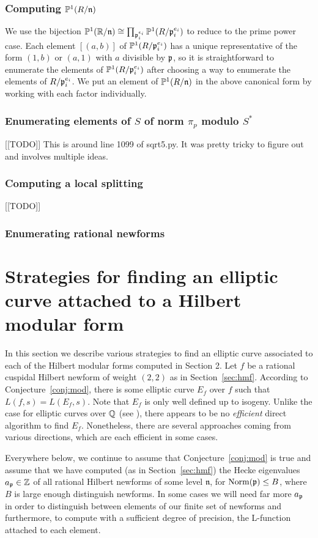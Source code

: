 \documentclass{amsart}
\newcommand{\n}{\mathfrak{n}}
\begin{document}
\subsubsection{Computing $\P^1(R/\n)$}
We use the bijection $\P^1(\R/\n) \isom \prod_{\p_i^{e_i}}
\P^1(R/\p_i^{e_i})$ to reduce to the prime power case.  Each element
$[(a,b)]$ of $\mathbb{P}^1(R/\mathfrak{p}_i^{e_i})$ has a unique representative of the
form $(1,b)$ or $(a,1)$ with $a$ divisible by $\mathfrak{p}$, so it is straightforward
to enumerate the elements of $\mathbb{P}^1(R/\mathfrak{p}_i^{e_i})$ after choosing a way
to enumerate the elements of $R/\mathfrak{p}_i^{e_i}$. We put an element
of $\P^1(R/\n)$ in the above canonical form by working with each factor
individually.

\subsubsection{Enumerating elements of $S$ of norm $\pi_p$ modulo $S^*$}
[[TODO]]
This is around line 1099 of sqrt5.py.  It was pretty tricky to figure out
and involves multiple ideas.

\subsubsection{Computing a local splitting}
[[TODO]]

\subsubsection{Enumerating rational newforms}


\section{Strategies for finding an elliptic curve attached to a Hilbert modular form}\label{sec:finding}
In this section we describe various strategies to find an elliptic curve
 associated to each of the Hilbert modular forms computed in Section 2.
Let $f$ be a rational cuspidal Hilbert newform of weight $(2,2)$ as
in Section~\ref{sec:hmf}.  According to Conjecture~\ref{conj:mod},
there is some elliptic curve $E_f$ over $f$ such that $L(f,s) =
L(E_f,s)$.  Note that $E_f$ is only well defined up to isogeny.
Unlike the case for elliptic curves over $\mathbb{Q}$ (see \cite{cremona:algs}), 
there appears to be no {\em efficient} direct algorithm to find $E_f$.
 Nonetheless, there are several approaches coming from various directions, 
which are each efficient in some cases.

Everywhere below, we continue to assume that Conjecture~\ref{conj:mod}
is true and assume that we have computed (as in Section~\ref{sec:hmf})
the Hecke eigenvalues $a_{\mathfrak{p}}\in \mathbb{Z}$ of all rational Hilbert newforms of
some level $\n$, for $\operatorname{Norm}(\mathfrak{p})\leq B$, where $B$ is large enough
distinguish newforms. In some cases we will need far more $a_{\mathfrak{p}}$ in 
order to distinguish between elements of our finite set of newforms and 
furthermore, to compute with a sufficient degree of precision, 
the L-function attached to each element.
\end{document}
